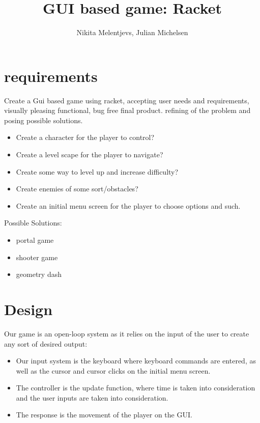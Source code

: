 \documentclass{article}
\begin{document}
	
	\title{GUI based game: Racket}
	\author{Nikita Melentjevs, Julian Michelsen}
	
	\maketitle
	
	\section{requirements}
	Create a Gui based game using racket, accepting user needs and requirements, 
	visually pleasing functional, bug free final product. \newline
	refining of the problem and posing possible solutions.
	\begin{itemize}
		\item Create a character for the player to control?
		\item Create a level scape for the player to navigate?
		\item Create some way to level up and increase difficulty?
		\item Create enemies of some sort/obstacles?
		\item Create an initial menu screen for the player to choose options and such.
	\end{itemize}
	Possible Solutions:
	\begin{itemize}
		\item portal game
		\item shooter game
		\item geometry dash
	\end{itemize}
	\section{Design}
	Our game is an open-loop system as it relies on the input of the user to create 
	any sort of desired output:
	\begin{itemize}
		\item Our input system is the keyboard where keyboard commands are entered, as well as the cursor and cursor clicks on the initial menu screen.
		\item The controller is the update function, where time is taken into consideration and the user inputs are taken into consideration.
		\item The response is the movement of the player on the GUI.
	\end{itemize}
	\newpage
\end{document}
